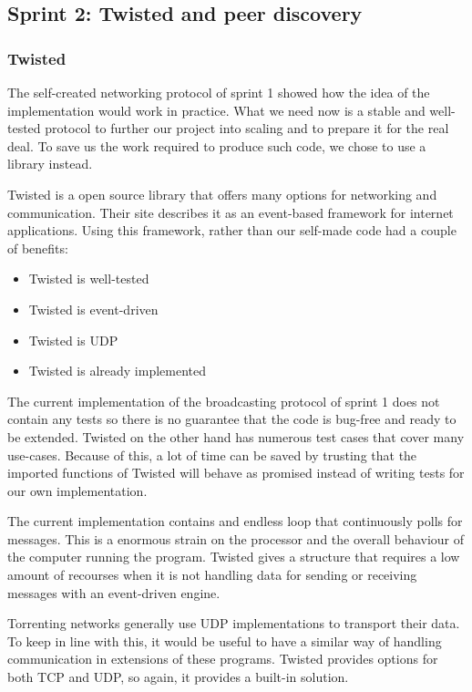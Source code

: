 \subsection{Sprint 2: Twisted and peer discovery}

\subsubsection{Twisted}
The self-created networking protocol of sprint 1 showed how the idea of the implementation would work in practice.
What we need now is a stable and well-tested protocol to further our project into scaling and to prepare it for the real deal.
To save us the work required to produce such code, we chose to use a library instead.

Twisted is a open source library that offers many options for networking and communication. 
Their site describes it as an event-based framework for internet applications. Using this framework, rather than our self-made code had a couple of benefits:
\begin{itemize}
\item Twisted is well-tested
\item Twisted is event-driven
\item Twisted is UDP
\item Twisted is already implemented
\end{itemize}
The current implementation of the broadcasting protocol of sprint 1 does not contain any tests so there is no guarantee that the code is bug-free and ready to be extended.
Twisted on the other hand has numerous test cases that cover many use-cases.
Because of this, a lot of time can be saved by trusting that the imported functions of Twisted will behave as promised instead of writing tests for our own implementation.

The current implementation contains and endless loop that continuously polls for messages.
This is a enormous strain on the processor and the overall behaviour of the computer running the program.
Twisted gives a structure that requires a low amount of recourses when it is not handling data for sending or receiving messages with an event-driven engine.

Torrenting networks generally use UDP implementations to transport their data.
To keep in line with this, it would be useful to have a similar way of handling communication in extensions of these programs.
Twisted provides options for both TCP and UDP, so again, it provides a built-in solution.

